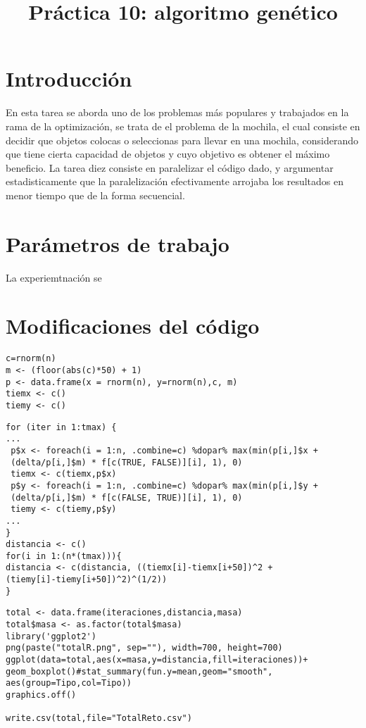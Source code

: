 \documentclass[a4paper]{article}
\title{Práctica 10: algoritmo genético}
\begin{document}
\maketitle

\section{Introducci\'on}
En esta tarea se aborda uno de los problemas más populares y trabajados en la rama de la optimización, se trata de el problema de la mochila, el cual consiste en decidir que objetos colocas o seleccionas para llevar en una mochila, considerando que tiene cierta capacidad de objetos y cuyo objetivo es obtener el máximo beneficio. La tarea diez consiste en paralelizar el código dado, y argumentar estadisticamente que la paralelización efectivamente arrojaba los resultados en menor tiempo que de la forma secuencial.

\section{Par\'ametros de trabajo}
La experiemtnación se 

\section{Modificaciones del código}


\begin{lstlisting}[frame=single]
c=rnorm(n)
m <- (floor(abs(c)*50) + 1)
p <- data.frame(x = rnorm(n), y=rnorm(n),c, m)
tiemx <- c()
tiemy <- c()
\end{lstlisting}



\begin{lstlisting}[frame=single]
for (iter in 1:tmax) {
...
 p$x <- foreach(i = 1:n, .combine=c) %dopar% max(min(p[i,]$x + 
 (delta/p[i,]$m) * f[c(TRUE, FALSE)][i], 1), 0)
 tiemx <- c(tiemx,p$x)
 p$y <- foreach(i = 1:n, .combine=c) %dopar% max(min(p[i,]$y + 
 (delta/p[i,]$m) * f[c(FALSE, TRUE)][i], 1), 0)
 tiemy <- c(tiemy,p$y)
...
}
distancia <- c()
for(i in 1:(n*(tmax))){
distancia <- c(distancia, ((tiemx[i]-tiemx[i+50])^2 + 
(tiemy[i]-tiemy[i+50])^2)^(1/2))
}
\end{lstlisting}


\begin{lstlisting}[frame=single]
total <- data.frame(iteraciones,distancia,masa)
total$masa <- as.factor(total$masa)
library('ggplot2')
png(paste("totalR.png", sep=""), width=700, height=700)
ggplot(data=total,aes(x=masa,y=distancia,fill=iteraciones))+
geom_boxplot()#stat_summary(fun.y=mean,geom="smooth",
aes(group=Tipo,col=Tipo))
graphics.off()

write.csv(total,file="TotalReto.csv")
\end{lstlisting}
\end{document}
